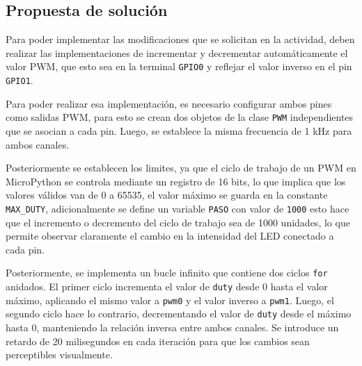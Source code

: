 \documentclass[letterpaper,12pt]{article}
\begin{document}
\begin{figure}[htbp]
    \end{figure}

    \subsection*{Propuesta de solución}

    Para poder implementar las modificaciones que se solicitan en la actividad, deben realizar las implementaciones de incrementar y decrementar automáticamente el valor PWM, que esto sea en la terminal \texttt{GPIO0} y reflejar el valor inverso en el pin \texttt{GPIO1}. 

    Para poder realizar esa implementación, es necesario configurar ambos pines como salidas PWM, para esto se crean dos objetos de la clase \texttt{PWM} independientes que se asocian a cada pin. Luego, se establece la misma frecuencia de 1 kHz para ambos canales.

    Posteriormente se establecen los limites, ya que el ciclo de trabajo de un PWM en MicroPython se controla mediante un registro de 16 bits, lo que implica que los valores válidos van de 0 a 65535, el valor máximo se guarda en la constante \texttt{MAX\_DUTY}, adicionalmente se define un variable \texttt{PASO} con valor de \texttt{1000} esto hace que el incremento o decremento del ciclo de trabajo sea de 1000 unidades, lo que permite observar claramente el cambio en la intensidad del LED conectado a cada pin.

    Posteriormente, se implementa un bucle infinito que contiene dos ciclos \texttt{for} anidados. El primer ciclo incrementa el valor de \texttt{duty} desde 0 hasta el valor máximo, aplicando el mismo valor a \texttt{pwm0} y el valor inverso a \texttt{pwm1}. Luego, el segundo ciclo hace lo contrario, decrementando el valor de \texttt{duty} desde el máximo hasta 0, manteniendo la relación inversa entre ambos canales. Se introduce un retardo de 20 milisegundos en cada iteración para que los cambios sean perceptibles visualmente.
\end{document}
